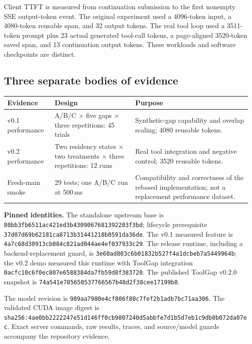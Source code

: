 \documentclass[10pt,a4paper]{article}
\begin{document}
Client TTFT is measured from continuation submission to the first nonempty SSE output-token event. The original experiment used a 4096-token input, a 4080-token reusable span, and 32 output tokens. The real tool loop used a 3511-token prompt plus 23 actual generated tool-call tokens, a page-aligned 3520-token saved span, and 13 continuation output tokens. These workloads and software checkpoints are distinct.

\subsection{Three separate bodies of evidence}
\begin{center}\small
\begin{tabularx}{\linewidth}{@{}p{27mm}p{34mm}X@{}}\toprule
Evidence & Design & Purpose\\\midrule
v0.1 performance & A/B/C $\times$ five gaps $\times$ three repetitions: 45 trials & Synthetic-gap capability and overlap scaling; 4080 reusable tokens.\\
v0.2 performance & Two residency states $\times$ two treatments $\times$ three repetitions: 12 runs & Real tool integration and negative control; 3520 reusable tokens.\\
Fresh-main smoke & 29 tests; one A/B/C run at 500\,ms & Compatibility and correctness of the rebased implementation; not a replacement performance dataset.\\\bottomrule
\end{tabularx}\end{center}

\textbf{Pinned identities.} The standalone upstream base is \nolinkurl{80bb3fb6511ac421ed3b4309067681392203f3bd}; lifecycle prerequisite \nolinkurl{37d07d69b62181ca8713b31441218b0591da36de}. The v0.1 measured feature is \nolinkurl{4a7c68d30913cb084c821ad044ae4ef037933c29}. The release runtime, including a backend-replacement guard, is \nolinkurl{3e60ad803c6b01832b527f4a1dcbeb7a5449964b}; the v0.2 demo measured this runtime with ToolGap integration \nolinkurl{0acfc10c6f0ec807e6588384da7fb59d8f383720}. The published ToolGap v0.2.0 snapshot is \nolinkurl{74a541e785650537766567b48d2f38cee17199b8}.

The model revision is \nolinkurl{989aa7980e4cf806f80c7fef2b1adb7bc71aa306}. The validated CUDA image digest is \nolinkurl{sha256:4ae0bb2222247e51d146ff0cb9807240d5abbfe7d1b5d7eb1c9db0b072da07ec}. Exact server commands, raw results, traces, and source/model guards accompany the repository evidence.
\end{document}
